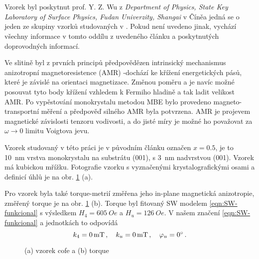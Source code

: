 \section{}
\label{chap:vzorek-cofe}

Vzorek byl poskytnut prof. Y. Z. Wu z \emph{Department of Physics, State Key Laboratory of Surface Physics, Fudan Univerzity, Shangai} v Číněa jedná se o jeden ze skupiny vzorků studovaných v .
Pokud není uvedeno jinak, vychází všechny informace v tomto oddílu z uvedeného článku a poskytnutých doprovodných informací.

Ve slitině  byl z prvních principů předpovědězen intrinsický mechanismus anizotropní magnetoresistence (AMR) -\tododash dochází ke křížení energetických pásů, které je závislé na orientaci magnetizace.
Změnou poměru  a  je navíc možné posouvat tyto body křížení vzhledem k Fermiho hladině a tak ladit velikost AMR.
Po vypěstování monokrystalu metodou MBE bylo provedeno magneto-transportní měření a předpověď silného AMR byla potvrzena.
AMR je projevem magnetické závislosti tenzoru vodivosti, a do jisté míry je možné ho považovat za $\omega\to 0$ limitu Voigtova jevu.

Vzorek studovaný v této práci je v původním článku označen $x=0.5$, je to \SI{10}{\nano\meter} vrstva monokrystalu  na substrátu (001), s \SI{3}{\nano\meter} nadvrstvou (001).
Vzorek má kubickou mřížku.
Fotografie vzorku s vyznačenými krystalografickými osami a definicí úhlů je na obr. \ref{fig:vzorek-cofe} (a).

Pro vzorek byla také torque-metrií změřena jeho in-plane magnetická anizotropie, změřený torque je na obr. \ref{fig:vzorek-cofe} (b).
Torque byl fitovaný SW modelem \eqref{eqn:SW-funkcional} s výsledkem $H_4=\SI{605}{Oe}$ a $H_u=\SI{126}{Oe}$.
V našem značení \eqref{eqn:SW-funkcional} a jednotkách to odpovídá
\begin{equation}
    k_4 = \SI{0}{\milli\tesla} \,,\quad k_u = \SI{0}{mT} \,,\quad \varphi_u = \SI{0}{\degree} \,.
\end{equation}

\begin{figure}[htbp]
    \centering
    \caption{(a) vzorek cofe a (b) torque}
    \label{fig:vzorek-cofe}
\end{figure}
